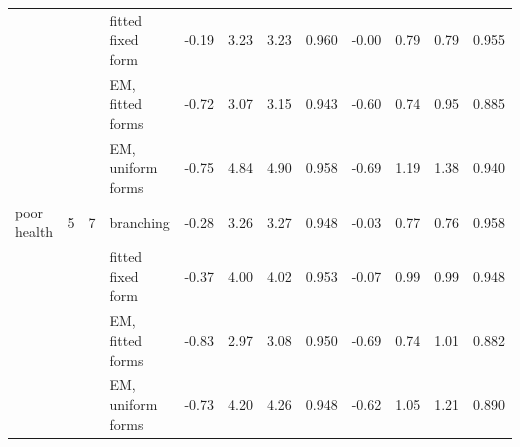 \begin{table}[h]
\begin{tabular}{lrrlrrrrrrrr}
 &  &  & fitted fixed form & -0.19 & 3.23 & 3.23 & 0.960 & -0.00 & 0.79 & 0.79 & 0.955 \\
 &  &  & EM, fitted forms & -0.72 & 3.07 & 3.15 & 0.943 & -0.60 & 0.74 & 0.95 & 0.885 \\
 &  &  & EM, uniform forms & -0.75 & 4.84 & 4.90 & 0.958 & -0.69 & 1.19 & 1.38 & 0.940 \\
poor health & 5 & 7 & branching & -0.28 & 3.26 & 3.27 & 0.948 & -0.03 & 0.77 & 0.76 & 0.958 \\
 &  &  & fitted fixed form & -0.37 & 4.00 & 4.02 & 0.953 & -0.07 & 0.99 & 0.99 & 0.948 \\
 &  &  & EM, fitted forms & -0.83 & 2.97 & 3.08 & 0.950 & -0.69 & 0.74 & 1.01 & 0.882 \\
 &  &  & EM, uniform forms & -0.73 & 4.20 & 4.26 & 0.948 & -0.62 & 1.05 & 1.21 & 0.890 \\
\bottomrule
\end{tabular}
\end{table}
